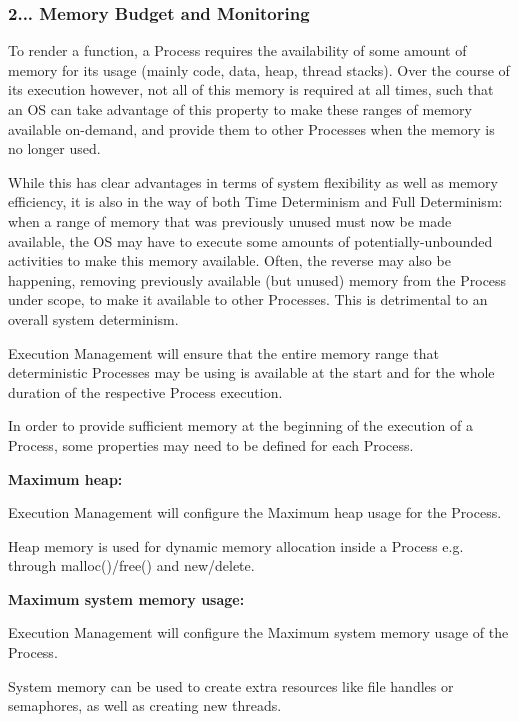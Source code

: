 \subsubsection*{2... {\bfseries Memory Budget and Monitoring}}


\begin{DoxyItemize}
\item To render a function, a Process requires the availability of some amount of memory for its usage (mainly code, data, heap, thread stacks). Over the course of its execution however, not all of this memory is required at all times, such that an OS can take advantage of this property to make these ranges of memory available on-\/demand, and provide them to other Processes when the memory is no longer used.
\item While this has clear advantages in terms of system flexibility as well as memory efficiency, it is also in the way of both Time Determinism and Full Determinism\+: when a range of memory that was previously unused must now be made available, the OS may have to execute some amounts of potentially-\/unbounded activities to make this memory available. Often, the reverse may also be happening, removing previously available (but unused) memory from the Process under scope, to make it available to other Processes. This is detrimental to an overall system determinism.
\item Execution Management will ensure that the entire memory range that deterministic Processes may be using is available at the start and for the whole duration of the respective Process execution.
\item In order to provide sufficient memory at the beginning of the execution of a Process, some properties may need to be defined for each Process.
\item {\bfseries Maximum heap\+:}
\begin{DoxyItemize}
\item Execution Management will configure the Maximum heap usage for the Process.
\item Heap memory is used for dynamic memory allocation inside a Process e.\+g. through malloc()/free() and new/delete.
\end{DoxyItemize}
\item {\bfseries Maximum system memory usage\+:}
\begin{DoxyItemize}
\item Execution Management will configure the Maximum system memory usage of the Process.
\item System memory can be used to create extra resources like file handles or semaphores, as well as creating new threads.

\end{DoxyItemize}
\end{DoxyItemize}

